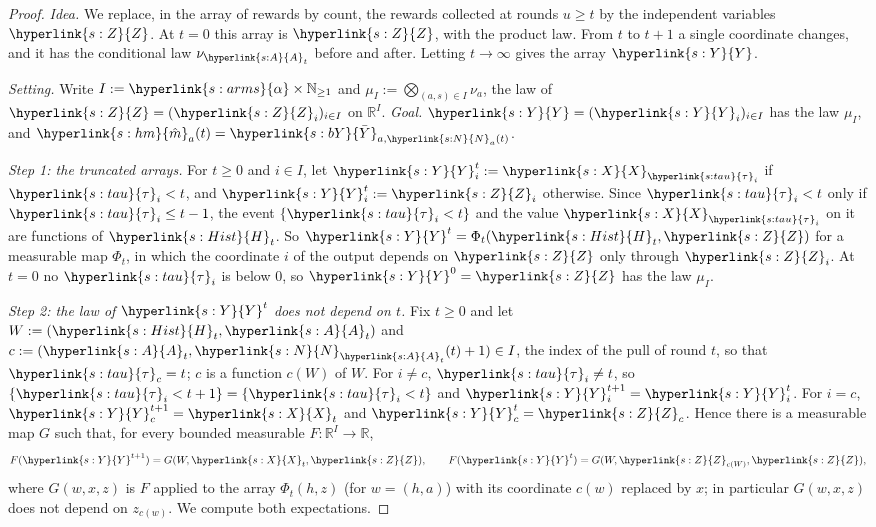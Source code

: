 \documentclass[11pt]{article}
\newcommand{\R}{\mathbb{R}}
\newcommand{\sy}[2]{{\hyperlink{#1}{#2}}}
\newcommand{\arms}{\sy{s:arms}{\alpha}}
\newcommand{\Hist}{\sy{s:Hist}{H}}
\newcommand{\Ap}{\sy{s:A}{A}}
\newcommand{\Xr}{\sy{s:X}{X}}
\newcommand{\Np}{\sy{s:N}{N}}
\newcommand{\hm}{\sy{s:hm}{\hat{m}}}
\newcommand{\taup}{\sy{s:tau}{\tau}}
\newcommand{\Yc}{\sy{s:Y}{Y}}
\newcommand{\bY}{\sy{s:bY}{\bar{Y}}}
\newcommand{\Zc}{\sy{s:Z}{Z}}
\begin{document}
\begin{proof}
\emph{Idea.} We replace, in the array of rewards by count, the rewards collected at rounds $u\ge t$
by the independent variables $\Zc$. At $t=0$ this array is $\Zc$, with the product law. From $t$ to
$t+1$ a single coordinate changes, and it has the conditional law $\nu_{\Ap_t}$ before and after.
Letting $t\to\infty$ gives the array $\Yc$.

\emph{Setting.} Write $I:=\arms\times\mathbb N_{\ge1}$ and $\mu_I:=\bigotimes_{(a,s)\in I}\nu_a$, the
law of $\Zc=(\Zc_i)_{i\in I}$ on $\R^I$. \emph{Goal.} $\Yc=(\Yc_i)_{i\in I}$ has the law $\mu_I$, and
$\hm_a(t)=\bY_{a,\Np_a(t)}$.

\emph{Step 1: the truncated arrays.} For $t\ge0$ and $i\in I$, let $\Yc^t_i:=\Xr_{\taup_i}$ if
$\taup_i<t$, and $\Yc^t_i:=\Zc_i$ otherwise. Since $\taup_i<t$ only if $\taup_i\le t-1$, the event
$\{\taup_i<t\}$ and the value $\Xr_{\taup_i}$ on it are functions of $\Hist_t$. So
$\Yc^t=\Phi_t(\Hist_t,\Zc)$ for a measurable map $\Phi_t$, in which the coordinate $i$ of the
output depends on $\Zc$ only through $\Zc_i$. At $t=0$ no $\taup_i$ is below $0$, so $\Yc^0=\Zc$
has the law $\mu_I$.

\emph{Step 2: the law of $\Yc^t$ does not depend on $t$.} Fix $t\ge0$ and let
$W:=(\Hist_t,\Ap_t)$ and $c:=(\Ap_t,\Np_{\Ap_t}(t)+1)\in I$, the index of the pull of round $t$, so
that $\taup_c=t$; $c$ is a function $c(W)$ of $W$. For $i\ne c$, $\taup_i\ne t$, so
$\{\taup_i<t+1\}=\{\taup_i<t\}$ and $\Yc^{t+1}_i=\Yc^t_i$. For $i=c$, $\Yc^{t+1}_c=\Xr_t$ and
$\Yc^t_c=\Zc_c$. Hence there is a measurable map $G$ such that, for every bounded measurable
$F:\R^I\to\R$,
\begin{equation*}
  F(\Yc^{t+1})=G(W,\Xr_t,\Zc),\qquad F(\Yc^t)=G(W,\Zc_{c(W)},\Zc),
\end{equation*}
where $G(w,x,z)$ is $F$ applied to the array $\Phi_t(h,z)$ (for $w=(h,a)$) with its coordinate $c(w)$
replaced by $x$; in particular $G(w,x,z)$ does not depend on $z_{c(w)}$. We compute both
expectations.


\end{proof}
\end{document}
